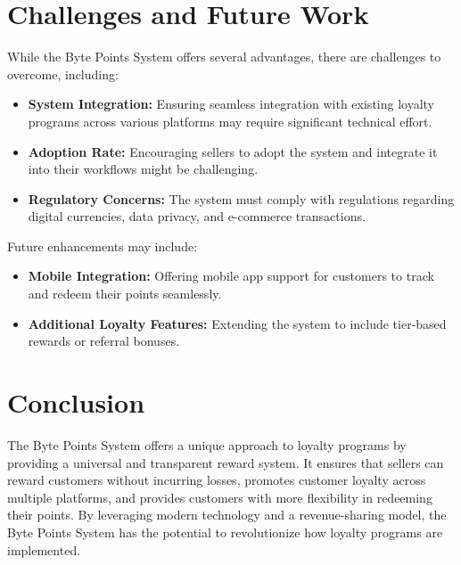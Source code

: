 \documentclass[a4paper,12pt]{article}
\begin{document}
\section{Challenges and Future Work}
While the Byte Points System offers several advantages, there are challenges to overcome, including:

\begin{itemize}
    \item \textbf{System Integration:} Ensuring seamless integration with existing loyalty programs across various platforms may require significant technical effort.
    \item \textbf{Adoption Rate:} Encouraging sellers to adopt the system and integrate it into their workflows might be challenging.
    \item \textbf{Regulatory Concerns:} The system must comply with regulations regarding digital currencies, data privacy, and e-commerce transactions.
\end{itemize}

Future enhancements may include:
\begin{itemize}
    \item \textbf{Mobile Integration:} Offering mobile app support for customers to track and redeem their points seamlessly.
    \item \textbf{Additional Loyalty Features:} Extending the system to include tier-based rewards or referral bonuses.
\end{itemize}

\section{Conclusion}
The Byte Points System offers a unique approach to loyalty programs by providing a universal and transparent reward system. It ensures that sellers can reward customers without incurring losses, promotes customer loyalty across multiple platforms, and provides customers with more flexibility in redeeming their points. By leveraging modern technology and a revenue-sharing model, the Byte Points System has the potential to revolutionize how loyalty programs are implemented.
\end{document}
